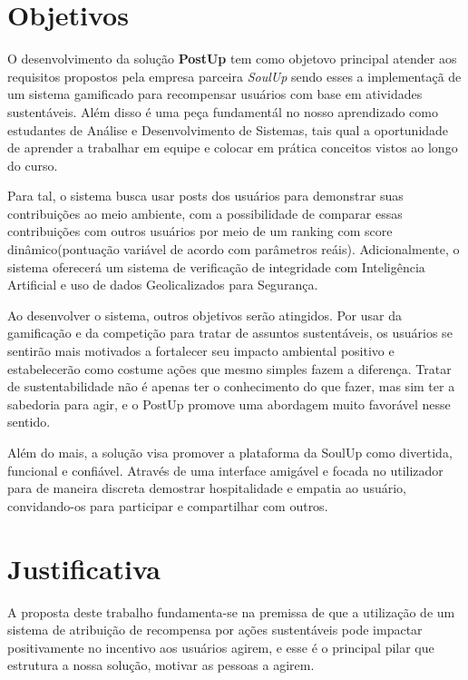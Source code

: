\documentclass[
  12pt,
  a4paper,
  oneside,
  chapter=TITLE,
  section=TITLE,
  brazil
]{abntex2}
\begin{document}
\chapter{Objetivos}
O desenvolvimento da solução \textbf{PostUp} tem como objetovo principal atender aos requisitos propostos pela empresa parceira \textit{SoulUp} sendo esses a implementaçã de um sistema gamificado para recompensar usuários com base em atividades sustentáveis. Além disso é uma peça fundamentál no nosso aprendizado como estudantes de Análise e Desenvolvimento de Sistemas, tais qual a oportunidade de aprender a trabalhar em equipe e colocar em prática conceitos vistos ao longo do curso.

Para tal, o sistema busca usar posts dos usuários para demonstrar suas contribuições ao meio ambiente, com a possibilidade de comparar essas contribuições com outros usuários por meio de um ranking com score dinâmico(pontuação variável de acordo com parâmetros reáis). Adicionalmente, o sistema oferecerá um sistema de verificação de integridade com Inteligência Artificial e uso de dados Geolicalizados para Segurança.

Ao desenvolver o sistema, outros objetivos serão atingidos. Por usar da gamificação e da competição para tratar de assuntos sustentáveis, os usuários se sentirão mais motivados a fortalecer seu impacto ambiental positivo e estabelecerão como costume ações que mesmo simples fazem a diferença. Tratar de sustentabilidade não é apenas ter o conhecimento do que fazer, mas sim ter a sabedoria para agir, e o PostUp promove uma abordagem muito favorável nesse sentido.

Além do mais, a solução visa promover a plataforma da SoulUp como divertida, funcional e confiável. Através de uma interface amigável e focada no utilizador para de maneira discreta demostrar hospitalidade e empatia ao usuário, convidando-os para participar e compartilhar com outros.

\chapter{Justificativa}
A proposta deste trabalho fundamenta-se na premissa de que a utilização de um sistema de atribuição de recompensa por ações sustentáveis pode impactar positivamente no incentivo aos usuários agirem, e esse é o principal pilar que estrutura a nossa solução, motivar as pessoas a agirem.
\end{document}
